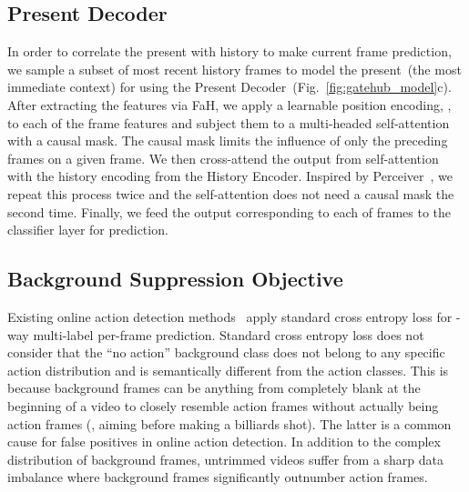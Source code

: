 \documentclass[10pt,twocolumn,letterpaper]{article}
\begin{document}
\subsection{Present Decoder}
In order to correlate the present with history to make current frame prediction, we sample a subset of  most recent history frames  to model the present~(\ie the most immediate context) for  using the Present Decoder~(Fig.~\ref{fig:gatehub_model}c). After extracting the features via FaH, we apply a learnable position encoding, , to each of the  frame features and subject them to a multi-headed self-attention with a causal mask. The causal mask limits the influence of only the preceding frames on a given frame. We then cross-attend the output from self-attention with the history encoding from the History Encoder. Inspired by Perceiver~\cite{jaegle2021perceiver}, we repeat this process twice and the self-attention does not need a causal mask the second time. Finally, we feed the output corresponding to each of  frames to the classifier layer for prediction.





























\subsection{Background Suppression Objective}
\label{sec:bg_suppression}
Existing online action detection methods~\cite{wang2021oadtr,xu2019temporal,xu2021long, gao2020woad, eun2020learning} apply standard cross entropy loss for -way multi-label per-frame prediction. Standard cross entropy loss does not consider that the ``no action'' background class does not belong to any specific action distribution and is semantically different from the  action classes. This is because background frames can be anything from completely blank at the beginning of a video to closely resemble action frames without actually being action frames (\eg, aiming before making a billiards shot). The latter is a common cause for false positives in online action detection. In addition to the complex distribution of background frames, untrimmed videos suffer from a sharp data imbalance where background frames significantly outnumber action frames. 
\end{document}
